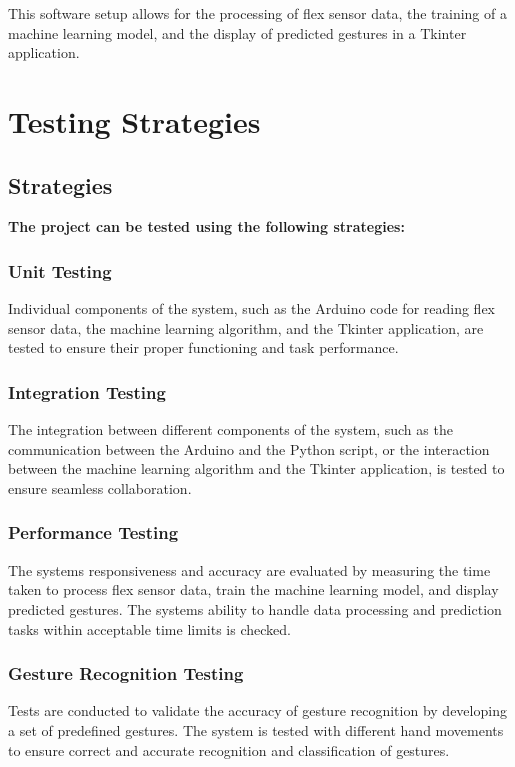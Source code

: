 \documentclass[a4paper,12pt,oneside]{report}
\begin{document}
\vspace{\baselineskip}

This software setup allows for the processing of flex sensor data, the
training of a machine learning model, and the display of predicted
gestures in a Tkinter application.
 
 


	
 \newpage
 \chapter{Testing Strategies}
 \section{Strategies}
 \textbf{\large The project can be tested using the following strategies:}
 \subsection{Unit Testing}
 \label{chap:Conclusion}
 
 
 Individual components of the system, such as the
Arduino code for reading flex sensor data, the machine learning
algorithm, and the Tkinter application, are tested to ensure their
proper functioning and task performance.
\subsection{Integration Testing}
The integration between different components
of the system, such as the communication between the Arduino and the Python script, or the interaction between the machine
learning algorithm and the Tkinter application, is tested to ensure
seamless collaboration.

\subsection{Performance Testing}
The systems responsiveness and accuracy
are evaluated by measuring the time taken to process flex sensor
data, train the machine learning model, and display predicted
gestures. The systems ability to handle data processing and
prediction tasks within acceptable time limits is checked.
\subsection{Gesture Recognition Testing}
Tests are conducted to validate the
accuracy of gesture recognition by developing a set of predefined
gestures. The system is tested with different hand movements to
ensure correct and accurate recognition and classification of
gestures.
\end{document}
